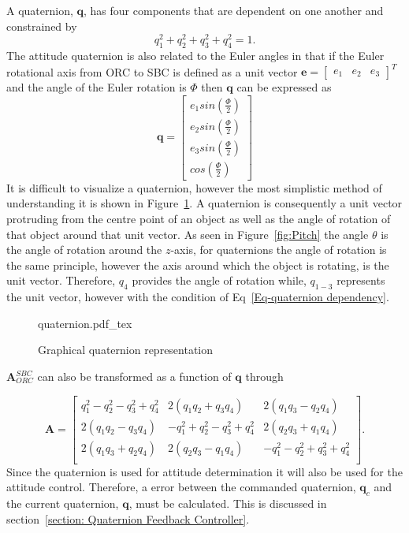 A quaternion, $\mathbf{q}$, has four components that are dependent on one another and constrained by 
\begin{equation} 
\label{Eq-quaternion dependency}
q_1^2 + q_2^2 + q_3^2 + q_4^2 = 1.
\end{equation}
The attitude quaternion is also related to the Euler angles in that if the Euler rotational axis from ORC to SBC is defined as a unit vector $\mathbf{e} = \begin{bmatrix} e_1  & e_2 & e_3 \end{bmatrix}^T$ and the angle of the Euler rotation is $\Phi$ then $\mathbf{q}$ can be expressed as
\begin{equation}
\mathbf{q} = \begin{bmatrix} e_1 sin(\frac{\Phi}{2}) \\ e_2 sin(\frac{\Phi}{2}) \\ e_3 sin(\frac{\Phi}{2}) \\ cos(\frac{\Phi}{2}) \end{bmatrix}
\end{equation}
It is difficult to visualize a quaternion, however the most simplistic method of understanding it is shown in Figure~\ref{fig:quaternion}. A quaternion is consequently a unit vector protruding from the centre point of an object as well as the angle of rotation of that object around that unit vector. As seen in Figure~\ref{fig:Pitch} the angle $\theta$ is the angle of rotation around the $z$-axis, for quaternions the angle of rotation is the same principle, however the axis around which the object is rotating, is the unit vector. Therefore, $q_4$ provides the angle of rotation while, $q_{1-3}$ represents the unit vector, however with the condition of Eq~\ref{Eq-quaternion dependency}.

\begin{figure}[!htb]
	\centering
	\def\svgwidth{10cm}
	{quaternion.pdf_tex}
	\label{fig:quaternion}
	\caption{Graphical quaternion representation}
\end{figure}

$\boldsymbol{A}^{SBC}_{ORC}$ can also be transformed as a function of $\mathbf{q}$ \cite{wertz2012spacecraft} through

\begin{equation}
\label{eq:DCM_quaternion}
	\mathbf{A}
		= \begin{bmatrix}
		q_1^2 - q_2^2 - q_3^2 + q_4^2 & 2(q_1q_2 + q_3q_4) & 2(q_1q_3 - q_2q_4) \\
		2(q_1q_2 - q_3q_4) & -q_1^2 + q_2^2 - q_3^2 + q_4^2 & 2(q_2q_3 + q_1q_4) \\
		2(q_1q_3 + q_2q_4) & 2(q_2q_3 - q_1q_4) & -q_1^2 - q_2^2 + q_3^2 + q_4^2 \\
		\end{bmatrix}.
\end{equation}
Since the quaternion is used for attitude determination it will also be used for the attitude control. Therefore, a error between the commanded quaternion, $\mathbf{q}_c$ and the current quaternion, $\mathbf{q}$, must be calculated. This is discussed in section~\ref{section: Quaternion Feedback Controller}.

